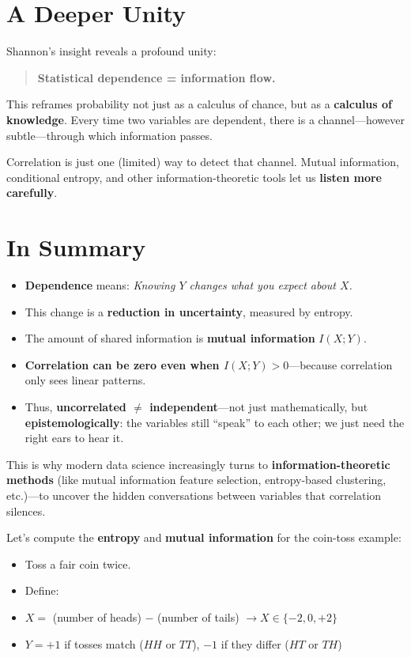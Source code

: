 \documentclass{article}
\begin{document}
\section*{A Deeper Unity}

Shannon’s insight reveals a profound unity:  
\begin{quote}
    \textbf{Statistical dependence = information flow.}
\end{quote}

This reframes probability not just as a calculus of chance, but as a \textbf{calculus of knowledge}. Every time two variables are dependent, there is a channel—however subtle—through which information passes.

Correlation is just one (limited) way to detect that channel. Mutual information, conditional entropy, and other information-theoretic tools let us \textbf{listen more carefully}.

\section*{In Summary}
\begin{itemize}

\item \textbf{Dependence} means: \textit{Knowing \(Y\) changes what you expect about \(X\).}
    \item This change is a \textbf{reduction in uncertainty}, measured by entropy.
    \item The amount of shared information is \textbf{mutual information} \(I(X;Y)\).
    \item \textbf{Correlation can be zero even when \(I(X;Y) > 0\)}—because correlation only sees linear patterns.
    \item Thus, \textbf{uncorrelated \(\ne\) independent}—not just mathematically, but \textbf{epistemologically}: the variables still ``speak'' to each other; we just need the right ears to hear it.
\end{itemize}

This is why modern data science increasingly turns to \textbf{information-theoretic methods} (like mutual information feature selection, entropy-based clustering, etc.)—to uncover the hidden conversations between variables that correlation silences.


Let’s compute the \textbf{entropy} and \textbf{mutual information} for the coin-toss example:

\begin{itemize}
\item Toss a fair coin twice.
    \item Define:
        \item \(X =\) (number of heads) \(-\) (number of tails) \(\rightarrow X \in \{-2, 0, +2\}\)
        \item \(Y = +1\) if tosses match (\(HH\) or \(TT\)), \(-1\) if they differ (\(HT\) or \(TH\))
\end{itemize}
\end{document}

